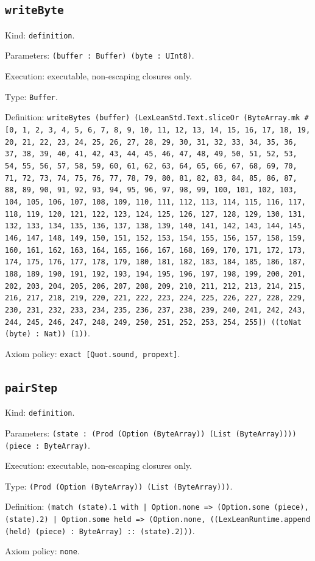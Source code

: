 \documentclass[11pt]{article}
\begin{document}
\subsection*{\texttt{writeByte}}
\noindent Kind: \texttt{definition}.\par
\noindent Parameters: \texttt{(buffer : Buffer) (byte : UInt8)}.\par
\noindent Execution: executable, non-escaping closures only.\par
\noindent Type: \texttt{Buffer}.\par
\noindent Definition: \texttt{writeBytes (buffer) (LexLeanStd.Text.sliceOr (ByteArray.mk \#[0, 1, 2, 3, 4, 5, 6, 7, 8, 9, 10, 11, 12, 13, 14, 15, 16, 17, 18, 19, 20, 21, 22, 23, 24, 25, 26, 27, 28, 29, 30, 31, 32, 33, 34, 35, 36, 37, 38, 39, 40, 41, 42, 43, 44, 45, 46, 47, 48, 49, 50, 51, 52, 53, 54, 55, 56, 57, 58, 59, 60, 61, 62, 63, 64, 65, 66, 67, 68, 69, 70, 71, 72, 73, 74, 75, 76, 77, 78, 79, 80, 81, 82, 83, 84, 85, 86, 87, 88, 89, 90, 91, 92, 93, 94, 95, 96, 97, 98, 99, 100, 101, 102, 103, 104, 105, 106, 107, 108, 109, 110, 111, 112, 113, 114, 115, 116, 117, 118, 119, 120, 121, 122, 123, 124, 125, 126, 127, 128, 129, 130, 131, 132, 133, 134, 135, 136, 137, 138, 139, 140, 141, 142, 143, 144, 145, 146, 147, 148, 149, 150, 151, 152, 153, 154, 155, 156, 157, 158, 159, 160, 161, 162, 163, 164, 165, 166, 167, 168, 169, 170, 171, 172, 173, 174, 175, 176, 177, 178, 179, 180, 181, 182, 183, 184, 185, 186, 187, 188, 189, 190, 191, 192, 193, 194, 195, 196, 197, 198, 199, 200, 201, 202, 203, 204, 205, 206, 207, 208, 209, 210, 211, 212, 213, 214, 215, 216, 217, 218, 219, 220, 221, 222, 223, 224, 225, 226, 227, 228, 229, 230, 231, 232, 233, 234, 235, 236, 237, 238, 239, 240, 241, 242, 243, 244, 245, 246, 247, 248, 249, 250, 251, 252, 253, 254, 255]) ((toNat (byte) : Nat)) (1))}.\par
\noindent Axiom policy: \texttt{exact [Quot.sound, propext]}.\par
\subsection*{\texttt{pairStep}}
\noindent Kind: \texttt{definition}.\par
\noindent Parameters: \texttt{(state : (Prod (Option (ByteArray)) (List (ByteArray)))) (piece : ByteArray)}.\par
\noindent Execution: executable, non-escaping closures only.\par
\noindent Type: \texttt{(Prod (Option (ByteArray)) (List (ByteArray)))}.\par
\noindent Definition: \texttt{(match (state).1 with | Option.none => (Option.some (piece), (state).2) | Option.some held => (Option.none, ((LexLeanRuntime.append (held) (piece) : ByteArray) :: (state).2)))}.\par
\noindent Axiom policy: \texttt{none}.\par
\end{document}
